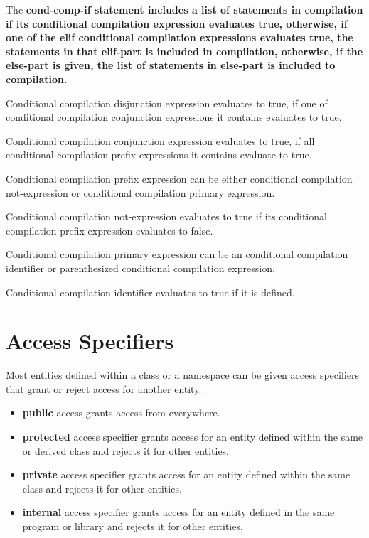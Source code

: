 \documentclass[a4paper,oneside,11pt]{article}
\begin{document}
The \bf{cond-comp-if} statement includes a list of statements in compilation
if its conditional compilation expression evaluates true,
otherwise, if one of the \bf{elif} conditional compilation expressions evaluates true,
the statements in that \bf{elif}-part is included in compilation, otherwise,
if the \bf{else}-part is given, the list of statements in \bf{else}-part is
included to compilation.

Conditional compilation disjunction expression evaluates to true,
if one of conditional compilation conjunction expressions it contains evaluates to true.

Conditional compilation conjunction expression evaluates to true,
if all conditional compilation prefix expressions it contains evaluate to true.

Conditional compilation prefix expression can be either conditional compilation not-expression
or conditional compilation primary expression.

Conditional compilation not-expression evaluates to true if its conditional compilation
prefix expression evaluates to false.

Conditional compilation primary expression can be an conditional compilation identifier or
parenthesized conditional compilation expression.

Conditional compilation identifier evaluates to true if it is defined.

\section{Access Specifiers}

Most entities defined within a class or a namespace can be given access specifiers that grant or reject access for another entity.

\begin{itemize}
\item{\bf{public}} access grants access from everywhere.

\item{\bf{protected}} access specifier grants access for an entity defined within the same or derived class and rejects it for other entities.

\item{\bf{private}} access specifier grants access for an entity defined within the same class and rejects it for other entities.

\item{\bf{internal}} access specifier grants access for an entity defined in the same program or library and rejects it for other entities.
\end{itemize}
\end{document}
